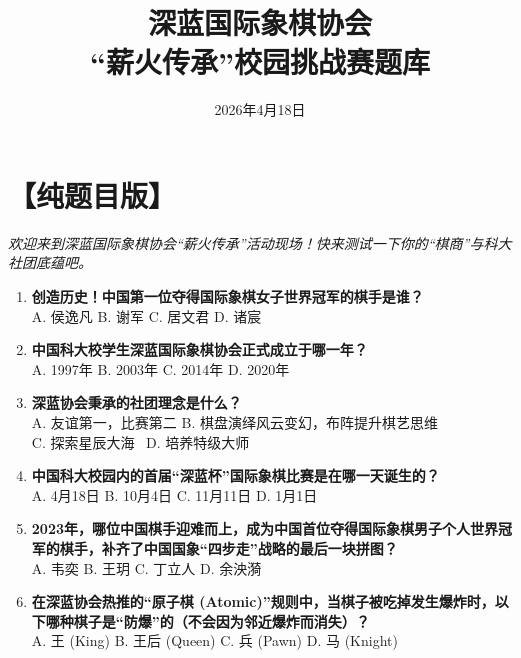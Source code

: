 \documentclass[a4paper, 11pt]{ctexart}
\title{\textbf{\Huge 深蓝国际象棋协会}\\ \vspace{0.5em} \Large “薪火传承”校园挑战赛题库}
\author{}
\date{2026年4月18日}
\begin{document}
\maketitle

\newpage
\section*{【纯题目版】}
\textit{欢迎来到深蓝国际象棋协会“薪火传承”活动现场！快来测试一下你的“棋商”与科大社团底蕴吧。}
\vspace{1em}

\begin{enumerate}[label=\arabic*., itemsep=1.5em]

    \item \textbf{创造历史！中国第一位夺得国际象棋女子世界冠军的棋手是谁？} \\
    A. 侯逸凡 \qquad B. 谢军 \qquad C. 居文君 \qquad D. 诸宸

    \item \textbf{中国科大校学生深蓝国际象棋协会正式成立于哪一年？} \\
    A. 1997年 \qquad B. 2003年 \qquad C. 2014年 \qquad D. 2020年

    \item \textbf{深蓝协会秉承的社团理念是什么？} \\
    A. 友谊第一，比赛第二 \qquad B. 棋盘演绎风云变幻，布阵提升棋艺思维 \\
    C. 探索星辰大海 \qquad \qquad \, D. 培养特级大师

    \item \textbf{中国科大校园内的首届“深蓝杯”国际象棋比赛是在哪一天诞生的？} \\
    A. 4月18日 \qquad B. 10月4日 \qquad C. 11月11日 \qquad D. 1月1日

    \item \textbf{2023年，哪位中国棋手迎难而上，成为中国首位夺得国际象棋男子个人世界冠军的棋手，补齐了中国国象“四步走”战略的最后一块拼图？} \\
    A. 韦奕 \qquad B. 王玥 \qquad C. 丁立人 \qquad D. 余泱漪

    \item \textbf{在深蓝协会热推的“原子棋 (Atomic)”规则中，当棋子被吃掉发生爆炸时，以下哪种棋子是“防爆”的（不会因为邻近爆炸而消失）？} \\
    A. 王 (King) \qquad B. 王后 (Queen) \qquad C. 兵 (Pawn) \qquad D. 马 (Knight)


\end{enumerate}
\end{document}
